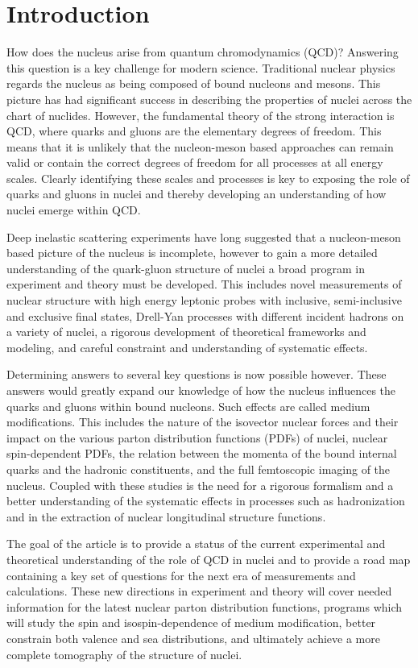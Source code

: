 \section{Introduction}
%
How does the nucleus arise from quantum chromodynamics (QCD)? Answering this question is a key challenge for modern science. Traditional nuclear physics regards the nucleus as being composed of bound nucleons and mesons. This picture has had significant success in describing the properties of nuclei across the chart of nuclides. However, the fundamental theory of the strong interaction is QCD, where quarks and gluons are the elementary degrees of freedom. This means that it is unlikely that the nucleon-meson based approaches can remain valid or contain the correct degrees of freedom for all processes at all energy scales. Clearly identifying these scales and processes is key to exposing the role of quarks and gluons in nuclei and thereby developing an understanding of how nuclei emerge within QCD.

Deep inelastic scattering experiments have long suggested that a nucleon-meson based picture of the nucleus is incomplete, however to gain a more detailed understanding of the quark-gluon structure of nuclei a broad program in experiment and theory must be developed. This includes novel measurements of nuclear structure with high energy leptonic probes with inclusive, semi-inclusive and exclusive final states, Drell-Yan processes with different incident hadrons on a variety of nuclei, a rigorous development of theoretical frameworks and modeling, and careful constraint and understanding of systematic effects.

Determining answers to several key questions is now possible however. These answers would greatly expand our knowledge of how the nucleus influences the quarks and gluons within bound nucleons. Such effects are called medium modifications. This includes the nature of the isovector nuclear forces and their impact on the various parton distribution functions (PDFs) of nuclei, nuclear spin-dependent PDFs, the relation between the momenta of the bound internal quarks and the hadronic constituents, and the full femtoscopic imaging of the nucleus.  Coupled with these studies is the need for a rigorous formalism and a better understanding of the systematic effects in processes such as hadronization and in the extraction of nuclear longitudinal structure functions. 

The goal of the article is to provide a status of the current experimental and theoretical understanding of the role of QCD in nuclei and to provide a road map containing a key set of questions for the next era of measurements and calculations. These new directions in experiment and theory will cover needed information for the latest nuclear parton distribution functions, programs which will study the spin and isospin-dependence of medium modification, better constrain both valence and sea distributions, and ultimately achieve a more complete tomography of the structure of nuclei. 

